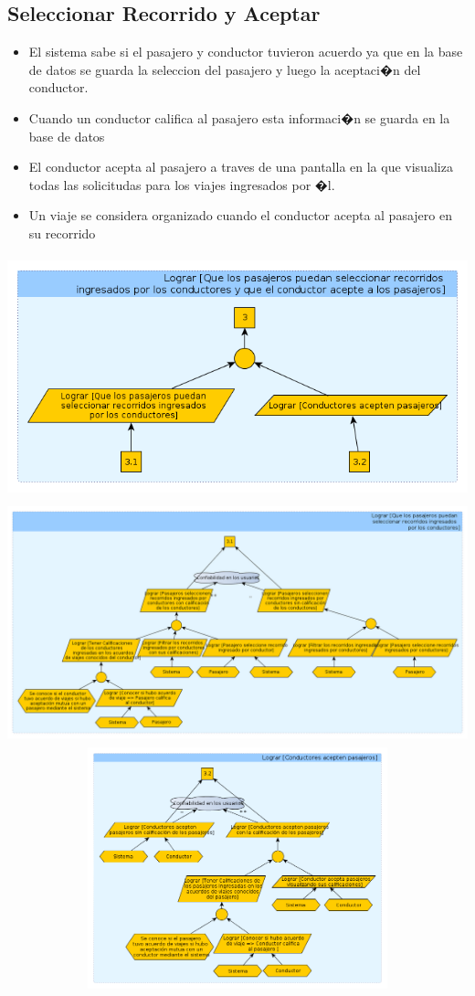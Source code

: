 \documentclass[a4paper,titlepage,10pt]{article}
\begin{document}
\subsection{Seleccionar Recorrido y Aceptar}
\begin{itemize}
\item El sistema sabe si el pasajero y conductor tuvieron acuerdo ya que en la base de datos se guarda la seleccion del pasajero y luego la aceptaci�n del conductor.
\item Cuando un conductor califica al pasajero esta informaci�n se guarda en la base de datos
\item El conductor acepta al pasajero a traves de una pantalla en la que visualiza todas las solicitudas para los viajes ingresados por �l.
\item Un viaje se considera organizado cuando el conductor acepta al pasajero en su recorrido
\end{itemize}
\includegraphics[height=7cm,width=19.5cm]{imagenes/Mostrar.png}
\includegraphics[height=7cm,width=19.5cm]{imagenes/Mostrara.png}
\includegraphics[height=7cm,width=19.5cm]{imagenes/Mostrarb.png}
\end{document}
